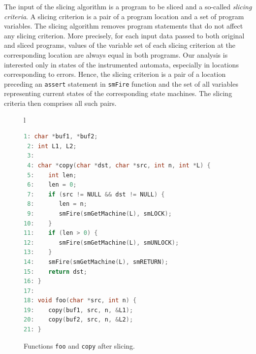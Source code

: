 \documentclass[10pt]{llncs}
\begin{document}

The input of the slicing algorithm is a program to be sliced and a so-called
\emph{slicing criteria}. A slicing criterion is a pair of a program location
and a set of program variables. The slicing algorithm removes program
statements that do not affect any slicing criterion. More precisely, for
each input data passed to both original and sliced programs, values of the
variable set of each slicing criterion at the corresponding location are
always equal in both programs. Our analysis is interested only in states of
the instrumented automata, especially in locations corresponding to errors.
Hence, the slicing criterion is a pair of a location preceding an
\texttt{assert} statement in \texttt{smFire} function and the set of all
variables representing current states of the corresponding state machines. The
slicing criteria then comprises all such pairs.

\begin{figure}[tb]
    \begin{center}
    \begin{tabular}{l}
    \begin{lstlisting}[language=C]
 1: char *buf1, *buf2;
 2: int L1, L2;
 3:
 4: char *copy(char *dst, char *src, int n, int *L) {
 5:    int len;
 6:    len = 0;
 7:    if (src != NULL && dst != NULL) {
 8:       len = n;
 9:       smFire(smGetMachine(L), smLOCK);
10:    }
11:    if (len > 0) {
12:       smFire(smGetMachine(L), smUNLOCK);
13:    }
14:    smFire(smGetMachine(L), smRETURN);
15:    return dst;
16: }
17:
18: void foo(char *src, int n) {
19:    copy(buf1, src, n, &L1);
20:    copy(buf2, src, n, &L2);
21: }
    \end{lstlisting}
    \end{tabular}
    \end{center}
    \caption{Functions \texttt{foo} and \texttt{copy} after slicing.}
    \label{fig:copy_sliced}
\end{figure}
\end{document}
